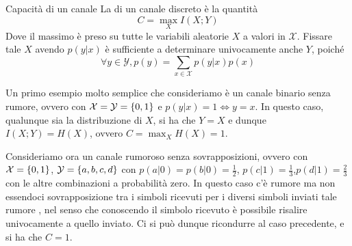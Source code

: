\begin{definition}{Capacità di un canale}
  La  di un canale discreto è la quantità
  \[C = \max_{X} I(X;Y)\]
  Dove il massimo è preso su tutte le variabili aleatorie \(X\) a valori in \(\mathcal{X}\).
  Fissare tale \(X\) avendo \(p(y|x)\) è sufficiente a determinare univocamente anche \(Y\), poiché
  \[\forall y \in \mathcal{Y}, p(y) = \sum_{x\in\mathcal{X}} p(y|x)p(x)\]
\end{definition}

\begin{example}{}
  Un primo esempio molto semplice che consideriamo è un canale binario senza rumore, ovvero con \(\mathcal{X} = \mathcal{Y} = \set{0,1}\) e \(p(y|x) = 1 \iff y=x\).
  In questo caso, qualunque sia la distribuzione di \(X\), si ha che \(Y=X\) e dunque \(I(X;Y) = H(X)\), ovvero \(C = \max_{X} H(X) = 1\).

  Consideriamo ora un canale rumoroso senza sovrapposizioni, ovvero con \(\mathcal{X} = \set{0,1}\), \(\mathcal{Y} = \set{a,b,c,d}\) con \(p(a|0) = p(b|0) = \frac{1}{2}\), \(p(c|1) = \frac{1}{3}\),\(p(d|1) = \frac{2}{3}\) con le altre combinazioni a probabilità zero.
  In questo caso c'è rumore ma non essendoci sovrapposizione tra i simboli ricevuti per i diversi simboli inviati tale rumore , nel senso che conoscendo il simbolo ricevuto è possibile risalire univocamente a quello inviato.
  Ci si può dunque ricondurre al caso precedente, e si ha che \(C = 1\).
\end{example}

